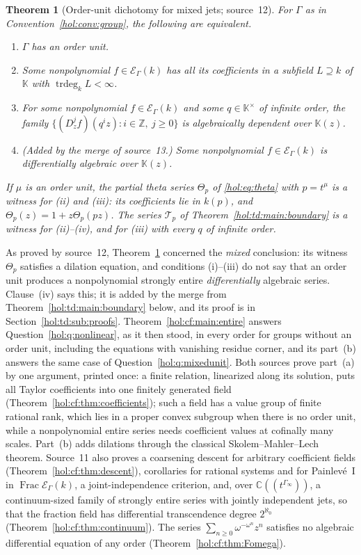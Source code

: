 \documentclass[11pt]{article}
\numberwithin{equation}{section}
\newtheorem{maintheorem}{Theorem}
\theoremstyle{definition}
\theoremstyle{remark}
\newcommand{\C}{\mathbb C}
\newcommand{\Z}{\mathbb Z}
\newcommand{\KK}{\mathbb K}
\newcommand{\EK}{\mathcal E_\Gamma(k)}
\newcommand{\FE}{\operatorname{Frac}\EK}
\newcommand{\trdeg}{\operatorname{trdeg}}
\begin{document}
\begin{maintheorem}[Order-unit dichotomy for mixed jets; source~12]
\label{hol:cf:main:sharp}
For $\Gamma$ as in Convention~\ref{hol:conv:group}, the following are
equivalent.
\begin{enumerate}[label=\textup{(\roman*)}]
\item $\Gamma$ has an order unit.
\item Some nonpolynomial $f\in\EK$ has all its coefficients in a subfield
$L\supseteq k$ of $\KK$ with $\trdeg_kL<\infty$.
\item For some nonpolynomial $f\in\EK$ and some $q\in\KK^\times$ of infinite
order, the family $\{(D_z^jf)(q^iz):i\in\Z,\ j\ge0\}$ is algebraically
dependent over $\KK(z)$.
\item \textup{(Added by the merge of source~13.)} Some nonpolynomial
$f\in\EK$ is differentially algebraic over $\KK(z)$.
\end{enumerate}
If $\mu$ is an order unit, the partial theta series $\Theta_p$ of
\eqref{hol:eq:theta} with $p=t^\mu$ is a witness for \textup{(ii)} and
\textup{(iii)}: its coefficients lie in $k(p)$, and
$\Theta_p(z)=1+z\Theta_p(pz)$. The series $\mathcal T_p$ of
Theorem~\ref{hol:td:main:boundary} is a witness for
\textup{(ii)}--\textup{(iv)}, and for \textup{(iii)} with every $q$ of infinite
order.
\end{maintheorem}

As proved by source~12, Theorem~\ref{hol:cf:main:sharp} concerned the
\emph{mixed} conclusion: its witness $\Theta_p$ satisfies a dilation equation,
and conditions (i)--(iii) do not say that an order unit produces a
nonpolynomial strongly entire \emph{differentially} algebraic series.
Clause~(iv) says this; it is added by the merge from
Theorem~\ref{hol:td:main:boundary} below, and its proof is in
Section~\ref{hol:td:sub:proofs}. Theorem~\ref{hol:cf:main:entire} answers
Question~\ref{hol:q:nonlinear}, as it then stood,
in every order for groups without an order unit, including the equations with
vanishing residue corner, and its part~(b) answers the same case of
Question~\ref{hol:q:mixedunit}. Both sources prove part~(a) by one argument,
printed once: a finite relation, linearized along its solution, puts all
Taylor coefficients into one finitely generated field
(Theorem~\ref{hol:cf:thm:coefficients}); such a field has a value group of
finite rational rank, which lies in a proper convex subgroup when there is no
order unit, while a nonpolynomial entire series needs coefficient values at
cofinally many scales. Part~(b) adds dilations through the classical
Skolem--Mahler--Lech theorem. Source~11 also proves a coarsening descent for
arbitrary coefficient fields (Theorem~\ref{hol:cf:thm:descent}), corollaries
for rational systems and for Painlev\'e~I in $\FE$, a joint-independence
criterion, and, over $\C((t^{\Gamma_\infty}))$, a continuum-sized family of
strongly entire series with jointly independent jets, so that the fraction
field has differential transcendence degree $2^{\aleph_0}$
(Theorem~\ref{hol:cf:thm:continuum}). The series
$\sum_{n\ge0}\omega^{-\omega^n}z^n$ satisfies no algebraic differential
equation of any order (Theorem~\ref{hol:cf:thm:Fomega}).
\end{document}

